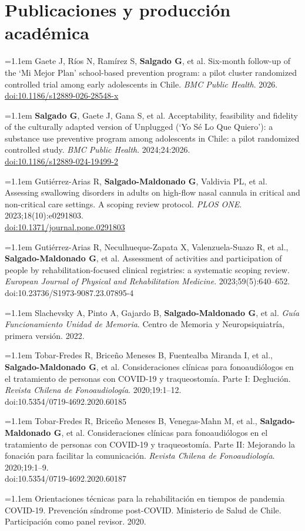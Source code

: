 \documentclass[10pt,a4paper]{article}
\newcommand{\pub}[2]{\hangindent=1.1em\hangafter=1 #1\\[-1pt]{\small\color{textgray}#2}\par\vspace{4pt}}
\begin{document}
\section*{Publicaciones y producción académica}
\pub{Gaete J, Ríos N, Ramírez S, \textbf{Salgado G}, et al. Six-month follow-up of the `Mi Mejor Plan' school-based prevention program: a pilot cluster randomized controlled trial among early adolescents in Chile. \emph{BMC Public Health}. 2026.}{\href{https://doi.org/10.1186/s12889-026-28548-x}{doi:10.1186/s12889-026-28548-x}}
\pub{\textbf{Salgado G}, Gaete J, Gana S, et al. Acceptability, feasibility and fidelity of the culturally adapted version of Unplugged (`Yo Sé Lo Que Quiero'): a substance use preventive program among adolescents in Chile: a pilot randomized controlled study. \emph{BMC Public Health}. 2024;24:2026.}{\href{https://doi.org/10.1186/s12889-024-19499-2}{doi:10.1186/s12889-024-19499-2}}
\pub{Gutiérrez-Arias R, \textbf{Salgado-Maldonado G}, Valdivia PL, et al. Assessing swallowing disorders in adults on high-flow nasal cannula in critical and non-critical care settings. A scoping review protocol. \emph{PLOS ONE}. 2023;18(10):e0291803.}{\href{https://doi.org/10.1371/journal.pone.0291803}{doi:10.1371/journal.pone.0291803}}
\pub{Gutiérrez-Arias R, Neculhueque-Zapata X, Valenzuela-Suazo R, et al., \textbf{Salgado-Maldonado G}, et al. Assessment of activities and participation of people by rehabilitation-focused clinical registries: a systematic scoping review. \emph{European Journal of Physical and Rehabilitation Medicine}. 2023;59(5):640--652.}{doi:10.23736/S1973-9087.23.07895-4}
\pub{Slachevsky A, Pinto A, Gajardo B, \textbf{Salgado-Maldonado G}, et al. \emph{Guía Funcionamiento Unidad de Memoria}. Centro de Memoria y Neuropsiquiatría, primera versión. 2022.}{}
\pub{Tobar-Fredes R, Briceño Meneses B, Fuentealba Miranda I, et al., \textbf{Salgado-Maldonado G}, et al. Consideraciones clínicas para fonoaudiólogos en el tratamiento de personas con COVID-19 y traqueostomía. Parte I: Deglución. \emph{Revista Chilena de Fonoaudiología}. 2020;19:1--12.}{doi:10.5354/0719-4692.2020.60185}
\pub{Tobar-Fredes R, Briceño Meneses B, Venegas-Mahn M, et al., \textbf{Salgado-Maldonado G}, et al. Consideraciones clínicas para fonoaudiólogos en el tratamiento de personas con COVID-19 y traqueostomía. Parte II: Mejorando la fonación para facilitar la comunicación. \emph{Revista Chilena de Fonoaudiología}. 2020;19:1--9.}{doi:10.5354/0719-4692.2020.60187}
\pub{Orientaciones técnicas para la rehabilitación en tiempos de pandemia COVID-19. Prevención síndrome post-COVID. Ministerio de Salud de Chile. Participación como panel revisor. 2020.}{}
\end{document}
